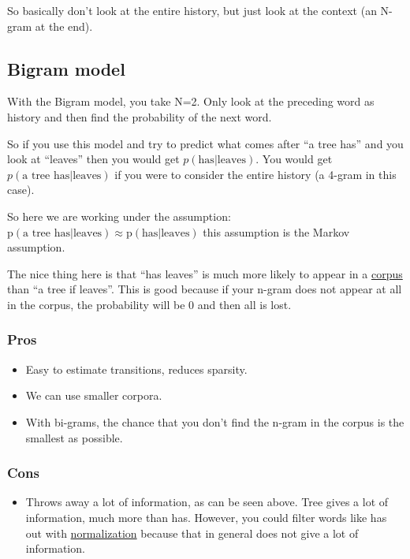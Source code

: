 \documentclass[
  11pt,
  british,
]{article}
\providecommand{\tightlist}{%
  \setlength{\itemsep}{0pt}\setlength{\parskip}{0pt}}
\begin{document}
So basically don't look at the entire history, but just look at the
context (an N-gram at the end).

\hypertarget{bigram-model}{%
\subsection{Bigram model}\label{bigram-model}}

With the Bigram model, you take N=2. Only look at the preceding word as
history and then find the probability of the next word.

So if you use this model and try to predict what comes after ``a tree
has'' and you look at ``leaves'' then you would get
\(p(\text{has}|\text{leaves})\). You would get
\(p(\text{a tree has}|\text{leaves})\) if you were to consider the
entire history (a 4-gram in this case).

So here we are working under the assumption:
\(\text{p}(\text{a tree has}|\text{leaves}) \approx \text{p}(\text{has}|\text{leaves})\)
this assumption is the Markov assumption.

The nice thing here is that ``has leaves'' is much more likely to appear
in a \href{../Data/Corpus.md}{corpus} than ``a tree if leaves''. This is
good because if your n-gram does not appear at all in the corpus, the
probability will be 0 and then all is lost.

\hypertarget{pros}{%
\subsubsection{Pros}\label{pros}}

\begin{itemize}
\tightlist
\item
  Easy to estimate transitions, reduces sparsity.
\item
  We can use smaller corpora.
\item
  With bi-grams, the chance that you don't find the n-gram in the corpus
  is the smallest as possible.
\end{itemize}

\hypertarget{cons}{%
\subsubsection{Cons}\label{cons}}

\begin{itemize}
\tightlist
\item
  Throws away a lot of information, as can be seen above. Tree gives a
  lot of information, much more than has. However, you could filter
  words like has out with \href{../Data/Normalization.md}{normalization}
  because that in general does not give a lot of information.
\end{itemize}
\end{document}
